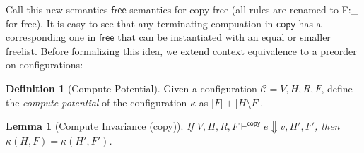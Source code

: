 \documentclass[11pt]{article}
\newcounter{rule}
\newtheorem{lemma}[theorem]{Lemma}
\theoremstyle{definition}
\newtheorem{definition}{Definition}[section]
\begin{document}
Call this new semantics $\mathsf{free}$ semantics for copy-free (all rules are renamed to F:\_ for free). 
It is easy to see that any terminating compuation
in $\mathsf{copy}$ has a corresponding one in $\mathsf{free}$ that can be instantiated with 
an equal or smaller freelist. Before formalizing this idea, we extend context equivalence to a preorder on 
configurations: 

\begin{definition}[Compute Potential]
Given a configuration $\mathcal{C} = V,H,R,F$, define the \emph{compute potential} 
of the configuration $\kappa$ as $|F| + |H \setminus F|$.
\end{definition}

\begin{lemma}[Compute Invariance (copy)]
If $V,H,R,F \vdash^{\mathsf{copy}} e \Downarrow v,H',F'$, then $\kappa(H,F) = \kappa(H',F')$.
\end{lemma}
\end{document}
